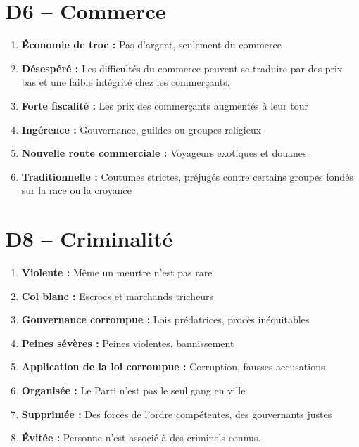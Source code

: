 \documentclass{article}
\begin{document}
\section*{D6 -- Commerce}
\begin{enumerate}
	\item \textbf{Économie de troc :} Pas d'argent, seulement du commerce
	\item \textbf{Désespéré :} Les difficultés du commerce peuvent se traduire par des prix bas et une faible intégrité chez les commerçants.
	\item \textbf{Forte fiscalité :} Les prix des commerçants augmentés à leur tour
	\item \textbf{Ingérence :} Gouvernance, guildes ou groupes religieux
	\item \textbf{Nouvelle route commerciale :} Voyageurs exotiques et douanes
	\item \textbf{Traditionnelle :} Coutumes strictes, préjugés contre certains groupes fondés sur la race ou la croyance
\end{enumerate}

\section*{D8 -- Criminalité}
\begin{enumerate}
	\item \textbf{Violente :} Même un meurtre n'est pas rare
	\item \textbf{Col blanc :} Escrocs et marchands tricheurs
	\item \textbf{Gouvernance corrompue :} Lois prédatrices, procès inéquitables
	\item \textbf{Peines sévères :} Peines violentes, bannissement
	\item \textbf{Application de la loi corrompue :} Corruption, fausses accusations
	\item \textbf{Organisée :} Le Parti n'est pas le seul gang en ville
	\item \textbf{Supprimée :} Des forces de l'ordre compétentes, des gouvernants justes
	\item \textbf{Évitée :} Personne n'est associé à des criminels connus.
\end{enumerate}
\end{document}
